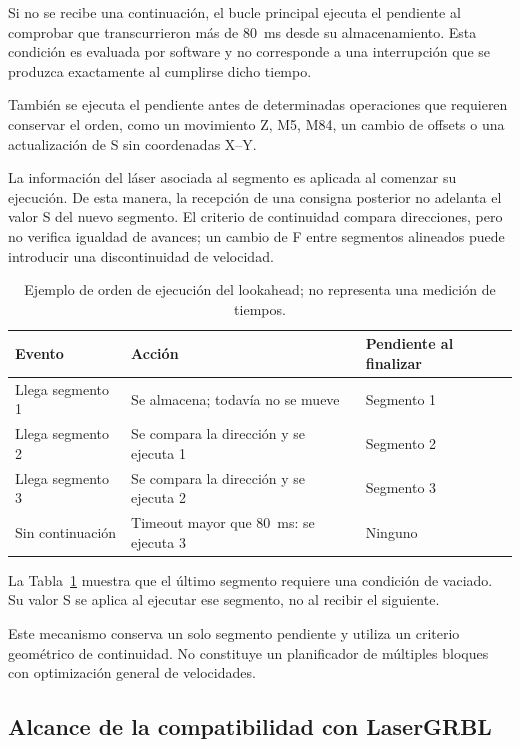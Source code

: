 \documentclass[blue,fullpaper]{ludusofficial}  %
\begin{document}
Si no se recibe una continuación, el bucle principal
ejecuta el pendiente al comprobar que transcurrieron
más de 80~ms desde su almacenamiento. Esta condición
es evaluada por software y no corresponde a una
interrupción que se produzca exactamente al cumplirse
dicho tiempo.

También se ejecuta el pendiente antes de determinadas
operaciones que requieren conservar el orden,
como un movimiento Z, M5, M84, un cambio de offsets
o una actualización de S sin coordenadas X--Y.

La información del láser asociada al segmento es aplicada
al comenzar su ejecución. De esta manera, la recepción
de una consigna posterior no adelanta el valor S del nuevo segmento. El criterio de continuidad compara direcciones, pero no verifica igualdad de avances; un cambio de F entre segmentos alineados puede introducir una discontinuidad de velocidad.

\begin{table}[htbp]
\centering\small
\caption{Ejemplo de orden de ejecución del lookahead; no representa una medición de tiempos.}
\label{tab:lookahead-secuencia}
\begin{tabularx}{\linewidth}{lXX}
\hline Evento & Acción & Pendiente al finalizar \\
\hline
Llega segmento 1 & Se almacena; todavía no se mueve & Segmento 1 \\
Llega segmento 2 & Se compara la dirección y se ejecuta 1 & Segmento 2 \\
Llega segmento 3 & Se compara la dirección y se ejecuta 2 & Segmento 3 \\
Sin continuación & Timeout mayor que 80~ms: se ejecuta 3 & Ninguno \\
\hline
\end{tabularx}
\end{table}

La Tabla~\ref{tab:lookahead-secuencia} muestra que el último segmento requiere una condición de vaciado. Su valor S se aplica al ejecutar ese segmento, no al recibir el siguiente.

Este mecanismo conserva un solo segmento pendiente
y utiliza un criterio geométrico de continuidad.
No constituye un planificador de múltiples bloques
con optimización general de velocidades.

\subsection{Alcance de la compatibilidad con LaserGRBL}
\end{document}
